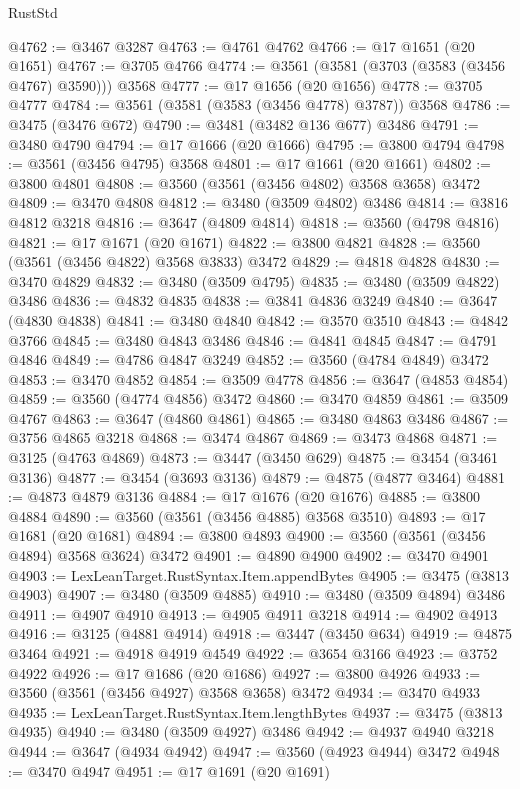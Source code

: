 \begin{lexlean}{RustStd}
\begin{coremodule}
@4762 := @3467 @3287
@4763 := @4761 @4762
@4766 := @17 @1651 (@20 @1651)
@4767 := @3705 @4766
@4774 := @3561 (@3581 (@3703 (@3583 (@3456 @4767) @3590))) @3568
@4777 := @17 @1656 (@20 @1656)
@4778 := @3705 @4777
@4784 := @3561 (@3581 (@3583 (@3456 @4778) @3787)) @3568
@4786 := @3475 (@3476 @672)
@4790 := @3481 (@3482 @136 @677) @3486
@4791 := @3480 @4790
@4794 := @17 @1666 (@20 @1666)
@4795 := @3800 @4794
@4798 := @3561 (@3456 @4795) @3568
@4801 := @17 @1661 (@20 @1661)
@4802 := @3800 @4801
@4808 := @3560 (@3561 (@3456 @4802) @3568 @3658) @3472
@4809 := @3470 @4808
@4812 := @3480 (@3509 @4802) @3486
@4814 := @3816 @4812 @3218
@4816 := @3647 (@4809 @4814)
@4818 := @3560 (@4798 @4816)
@4821 := @17 @1671 (@20 @1671)
@4822 := @3800 @4821
@4828 := @3560 (@3561 (@3456 @4822) @3568 @3833) @3472
@4829 := @4818 @4828
@4830 := @3470 @4829
@4832 := @3480 (@3509 @4795)
@4835 := @3480 (@3509 @4822) @3486
@4836 := @4832 @4835
@4838 := @3841 @4836 @3249
@4840 := @3647 (@4830 @4838)
@4841 := @3480 @4840
@4842 := @3570 @3510
@4843 := @4842 @3766
@4845 := @3480 @4843 @3486
@4846 := @4841 @4845
@4847 := @4791 @4846
@4849 := @4786 @4847 @3249
@4852 := @3560 (@4784 @4849) @3472
@4853 := @3470 @4852
@4854 := @3509 @4778
@4856 := @3647 (@4853 @4854)
@4859 := @3560 (@4774 @4856) @3472
@4860 := @3470 @4859
@4861 := @3509 @4767
@4863 := @3647 (@4860 @4861)
@4865 := @3480 @4863 @3486
@4867 := @3756 @4865 @3218
@4868 := @3474 @4867
@4869 := @3473 @4868
@4871 := @3125 (@4763 @4869)
@4873 := @3447 (@3450 @629)
@4875 := @3454 (@3461 @3136)
@4877 := @3454 (@3693 @3136)
@4879 := @4875 (@4877 @3464)
@4881 := @4873 @4879 @3136
@4884 := @17 @1676 (@20 @1676)
@4885 := @3800 @4884
@4890 := @3560 (@3561 (@3456 @4885) @3568 @3510)
@4893 := @17 @1681 (@20 @1681)
@4894 := @3800 @4893
@4900 := @3560 (@3561 (@3456 @4894) @3568 @3624) @3472
@4901 := @4890 @4900
@4902 := @3470 @4901
@4903 := LexLeanTarget.RustSyntax.Item.appendBytes
@4905 := @3475 (@3813 @4903)
@4907 := @3480 (@3509 @4885)
@4910 := @3480 (@3509 @4894) @3486
@4911 := @4907 @4910
@4913 := @4905 @4911 @3218
@4914 := @4902 @4913
@4916 := @3125 (@4881 @4914)
@4918 := @3447 (@3450 @634)
@4919 := @4875 @3464
@4921 := @4918 @4919 @4549
@4922 := @3654 @3166
@4923 := @3752 @4922
@4926 := @17 @1686 (@20 @1686)
@4927 := @3800 @4926
@4933 := @3560 (@3561 (@3456 @4927) @3568 @3658) @3472
@4934 := @3470 @4933
@4935 := LexLeanTarget.RustSyntax.Item.lengthBytes
@4937 := @3475 (@3813 @4935)
@4940 := @3480 (@3509 @4927) @3486
@4942 := @4937 @4940 @3218
@4944 := @3647 (@4934 @4942)
@4947 := @3560 (@4923 @4944) @3472
@4948 := @3470 @4947
@4951 := @17 @1691 (@20 @1691)

\end{coremodule}
\end{lexlean}
